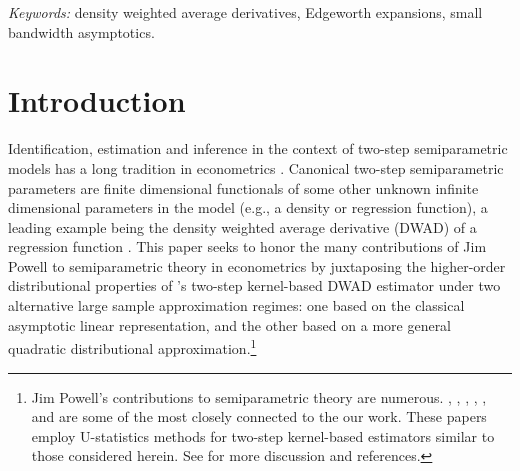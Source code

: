 \documentclass[11pt]{article}
\numberwithin{equation}{section}
\theoremstyle{definition}
\begin{document}
\textit{Keywords:} density weighted average derivatives, Edgeworth expansions, small bandwidth asymptotics.
\thispagestyle{empty}
\clearpage

\setcounter{page}{1}
\pagestyle{plain}




\pagestyle{plain}



\section{Introduction}

Identification, estimation and inference in the context of two-step semiparametric models has a long tradition in econometrics \citep{Powell_1994_HandbookCh}. Canonical two-step semiparametric parameters are finite dimensional functionals of some other unknown infinite dimensional parameters in the model (e.g., a density or regression function), a leading example being the density weighted average derivative (DWAD) of a regression function \citep{Stoker_1986_ECMA}. This paper seeks to honor the many contributions of Jim Powell to semiparametric theory in econometrics by juxtaposing the higher-order distributional properties of \citet{Powell-Stock-Stoker_1989_ECMA}'s two-step kernel-based DWAD estimator under two alternative large sample approximation regimes: one based on the classical asymptotic linear representation, and the other based on a more general quadratic distributional approximation.\footnote{Jim Powell's contributions to semiparametric theory are numerous. \citet{Honore-Powell_1994_JOE}, \citet{Powell-Stoker_1996_JoE}, \citet{Blundell-Powell_2004_RESTUD}, \citet{AradillasLopez-Honore-Powell_2007_IER}, \citet{Ahn-Ichimura-Powell-Ruud_2018_JBES}, and \citet{Graham-Niu-Powell_2023_JOE} are some of the most closely connected to the our work. These papers employ U-statistics methods for two-step kernel-based estimators similar to those considered herein. See \citet{Powell_2017_JEP} for more discussion and references. }
\end{document}
